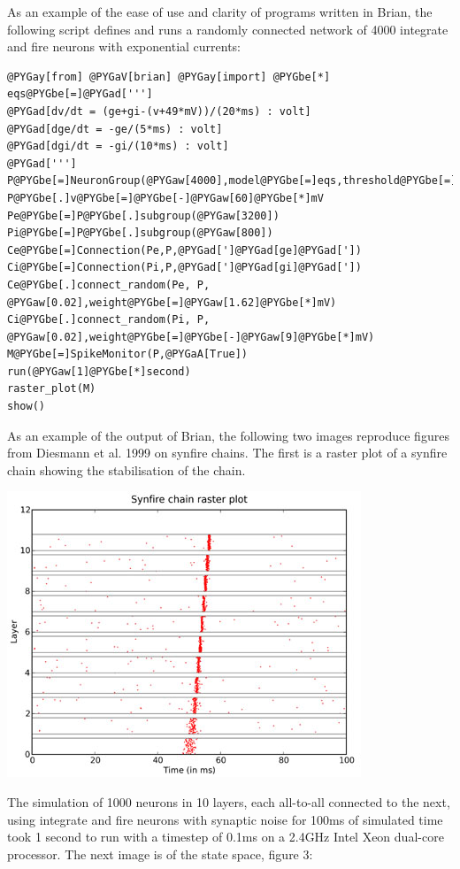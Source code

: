 \documentclass[letterpaper,10pt]{manual}
\begin{document}
As an example of the ease of use and clarity of programs written in Brian, the following script defines
and runs a randomly connected network of 4000 integrate and fire neurons with exponential currents:

\begin{Verbatim}[commandchars=@\[\]]
@PYGay[from] @PYGaV[brian] @PYGay[import] @PYGbe[*]
eqs@PYGbe[=]@PYGad[''']
@PYGad[dv/dt = (ge+gi-(v+49*mV))/(20*ms) : volt]
@PYGad[dge/dt = -ge/(5*ms) : volt]
@PYGad[dgi/dt = -gi/(10*ms) : volt]
@PYGad[''']
P@PYGbe[=]NeuronGroup(@PYGaw[4000],model@PYGbe[=]eqs,threshold@PYGbe[=]@PYGbe[-]@PYGaw[50]@PYGbe[*]mV,reset@PYGbe[=]@PYGbe[-]@PYGaw[60]@PYGbe[*]mV)
P@PYGbe[.]v@PYGbe[=]@PYGbe[-]@PYGaw[60]@PYGbe[*]mV
Pe@PYGbe[=]P@PYGbe[.]subgroup(@PYGaw[3200])
Pi@PYGbe[=]P@PYGbe[.]subgroup(@PYGaw[800])
Ce@PYGbe[=]Connection(Pe,P,@PYGad[']@PYGad[ge]@PYGad['])
Ci@PYGbe[=]Connection(Pi,P,@PYGad[']@PYGad[gi]@PYGad['])
Ce@PYGbe[.]connect_random(Pe, P, @PYGaw[0.02],weight@PYGbe[=]@PYGaw[1.62]@PYGbe[*]mV)
Ci@PYGbe[.]connect_random(Pi, P, @PYGaw[0.02],weight@PYGbe[=]@PYGbe[-]@PYGaw[9]@PYGbe[*]mV)
M@PYGbe[=]SpikeMonitor(P,@PYGaA[True])
run(@PYGaw[1]@PYGbe[*]second)
raster_plot(M)
show()
\end{Verbatim}

As an example of the output of Brian, the following two images reproduce figures from Diesmann et al. 1999
on synfire chains. The first is a raster plot of a synfire chain showing the stabilisation of the chain.

\includegraphics{synfirechain-example.jpg}

The simulation of 1000 neurons in 10 layers, each all-to-all connected to the next, using integrate and fire
neurons with synaptic noise for 100ms of simulated time took 1 second to run with a timestep of 0.1ms on a
2.4GHz Intel Xeon dual-core processor. The next image is of the state space, figure 3:
\end{document}
